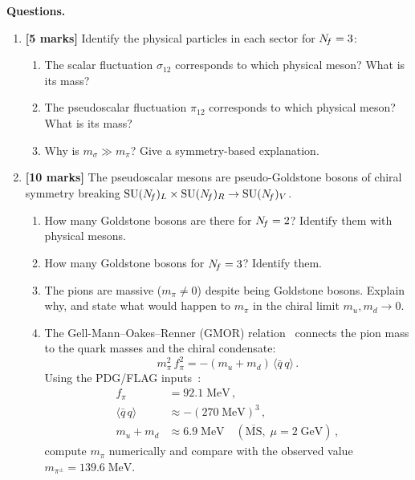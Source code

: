 \documentclass[11pt,a4paper]{article}
\newcommand{\fpi}{f_\pi}
\newcommand{\qqbar}{\langle \bar{q}\,q \rangle}
\begin{document}
\medskip

\noindent\textbf{Questions.}
\begin{enumerate}[label=(\alph*)]

  \item \textbf{[5 marks]}
    Identify the physical particles in each sector for $N_{\!f} = 3$:
    \begin{enumerate}[label=(\roman*)]
      \item The scalar fluctuation $\sigma_{12}$ corresponds to which
        physical meson?  What is its mass?
      \item The pseudoscalar fluctuation $\pi_{12}$ corresponds to which
        physical meson?  What is its mass?
      \item Why is $m_\sigma \gg m_\pi$?  Give a symmetry-based
        explanation.
    \end{enumerate}

  \item \textbf{[10 marks]}
    The pseudoscalar mesons are pseudo-Goldstone bosons of chiral
    symmetry breaking
    $\mathrm{SU}(N_{\!f})_L \times \mathrm{SU}(N_{\!f})_R \to \mathrm{SU}(N_{\!f})_V$.
    \begin{enumerate}[label=(\roman*)]
      \item How many Goldstone bosons are there for $N_{\!f} = 2$?
        Identify them with physical mesons.
      \item How many Goldstone bosons for $N_{\!f} = 3$?  Identify them.
      \item The pions are massive ($m_\pi \neq 0$) despite being
        Goldstone bosons.  Explain why, and state what would happen
        to $m_\pi$ in the chiral limit $m_u, m_d \to 0$.
      \item The Gell-Mann--Oakes--Renner (GMOR)
        relation~\cite{GMOR1968} connects the pion mass to the
        quark masses and the chiral condensate:
        \begin{equation}\label{eq:gmor-ex}
          m_\pi^2\, \fpi^2 = -(m_u + m_d)\,\qqbar\,.
        \end{equation}
        Using the PDG/FLAG inputs~\cite{PDG2024,FLAG2024}:
        \begin{align*}
          \fpi &= 92.1\;\text{MeV}\,, \\
          \qqbar &\approx -(270\;\text{MeV})^3\,, \\
          m_u + m_d &\approx 6.9\;\text{MeV}
            \quad(\overline{\text{MS}},\; \mu = 2\;\text{GeV})\,,
        \end{align*}
        compute $m_\pi$ numerically and compare with the observed
        value $m_{\pi^\pm} = 139.6\;\text{MeV}$.
    \end{enumerate}


\end{enumerate}
\end{document}
